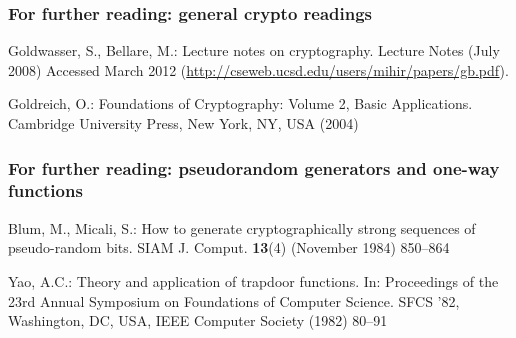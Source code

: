 \documentclass{beamer}
\begin{document}
\begin{frame}
  \frametitle{For further reading: general crypto readings}  
  \begin{thebibliography}{10}
    Goldwasser, S., Bellare, M.:
    \newblock Lecture notes on cryptography.
    \newblock Lecture Notes (July 2008) Accessed March 2012
    (\url{http://cseweb.ucsd.edu/users/mihir/papers/gb.pdf}).

    Goldreich, O.:
    \newblock Foundations of Cryptography: Volume 2, Basic Applications.
    \newblock Cambridge University Press, New York, NY, USA (2004)
  \end{thebibliography}
\end{frame}

\begin{frame}
  \frametitle{For further reading: pseudorandom generators and one-way functions}
  \begin{thebibliography}{10}
    Blum, M., Micali, S.:
    \newblock How to generate cryptographically strong sequences of pseudo-random
    bits.
    \newblock SIAM J. Comput. \textbf{13}(4) (November 1984)  850--864

    Yao, A.C.:
    \newblock Theory and application of trapdoor functions.
    \newblock In: Proceedings of the 23rd Annual Symposium on Foundations of
    Computer Science. SFCS '82, Washington, DC, USA, IEEE Computer Society (1982)
    80--91
  \end{thebibliography}
\end{frame}
\end{document}
